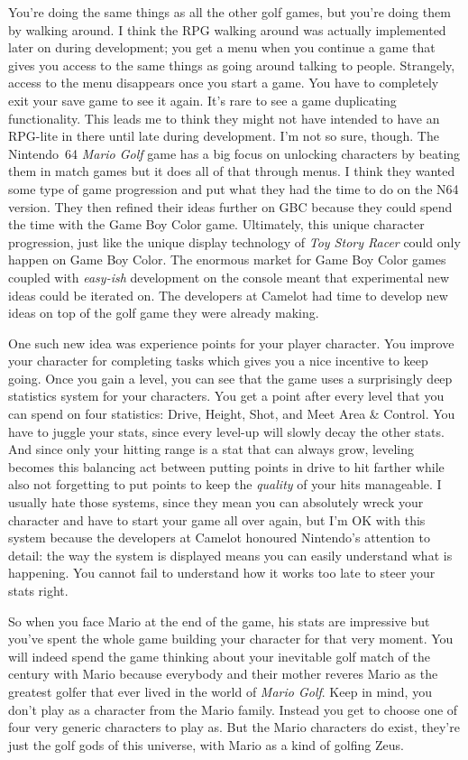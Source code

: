 \documentclass{book}
\begin{document}
You’re doing the same things as all the other golf games, but you’re doing them by walking around. I think the RPG walking around was actually implemented later on during development; you get a menu when you continue a game that gives you access to the same things as going around talking to people. Strangely, access to the menu disappears once you start a game. You have to completely exit your save game to see it again. It’s rare to see a game duplicating functionality. This leads me to think they might not have intended to have an RPG-lite in there until late during development. I’m not so sure, though. The Nintendo~64 \emph{Mario Golf} game has a big focus on unlocking characters by beating them in match games but it does all of that through menus. I think they wanted some type of game progression and put what they had the time to do on the N64 version. They then refined their ideas further on GBC because they could spend the time with the Game Boy Color game. Ultimately, this unique character progression, just like the unique display technology of \emph{Toy Story Racer} could only happen on Game Boy Color. The enormous market for Game Boy Color games coupled with \emph{easy-ish} development on the console meant that experimental new ideas could be iterated on. The developers at Camelot had time to develop new ideas on top of the golf game they were already making.\par
One such new idea was experience points for your player character. You improve your character for completing tasks which gives you a nice incentive to keep going. Once you gain a level, you can see that the game uses a surprisingly deep statistics system for your characters. You get a point after every level that you can spend on four statistics: Drive, Height, Shot, and Meet Area \& Control. You have to juggle your stats, since every level-up will slowly decay the other stats. And since only your hitting range is a stat that can always grow, leveling becomes this balancing act between putting points in drive to hit farther while also not forgetting to put points to keep the \emph{quality} of your hits manageable. I usually hate those systems, since they mean you can absolutely wreck your character and have to start your game all over again, but I’m OK with this system because the developers at Camelot honoured Nintendo’s attention to detail: the way the system is displayed means you can easily understand what is happening. You cannot fail to understand how it works too late to steer your stats right.\par
So when you face Mario at the end of the game, his stats are impressive but you’ve spent the whole game building your character for that very moment. You will indeed spend the game thinking about your inevitable golf match of the century with Mario because everybody and their mother reveres Mario as the greatest golfer that ever lived in the world of \emph{Mario Golf}. Keep in mind, you don’t play as a character from the Mario family. Instead you get to choose one of four very generic characters to play as. But the Mario characters do exist, they’re just the golf gods of this universe, with Mario as a kind of golfing Zeus.\par
\end{document}
